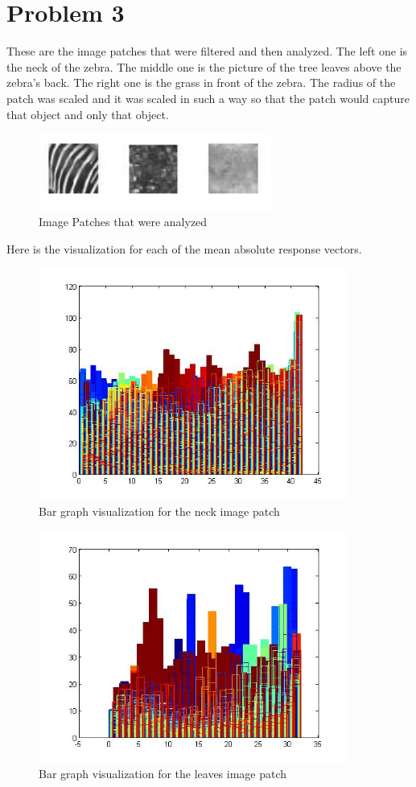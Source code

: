 \documentclass[11pt,psfig]{article}
\begin{document}
\newpage

\section*{Problem 3}

These are the image patches that were filtered and then analyzed. The left one is the neck of the zebra. The middle one is the picture of the tree leaves above the zebra's back. The right one is the grass in front of the zebra. The radius of the patch was scaled and it was scaled in such a way so that the patch would capture that object and only that object. 

\begin{figure}[H]
\centering
\includegraphics[width=3in]{prob3patches.jpg}
\caption{Image Patches that were analyzed}
\end{figure}

Here is the visualization for each of the mean absolute response vectors. 

\begin{figure}[H]
\centering
\includegraphics[height=3in]{prob3patch1bar.jpg}
\caption{Bar graph visualization for the neck image patch}
\end{figure}

\begin{figure}[H]
\centering
\includegraphics[height=3in]{prob3patch2bar.jpg}
\caption{Bar graph visualization for the leaves image patch}
\end{figure}
\end{document}
